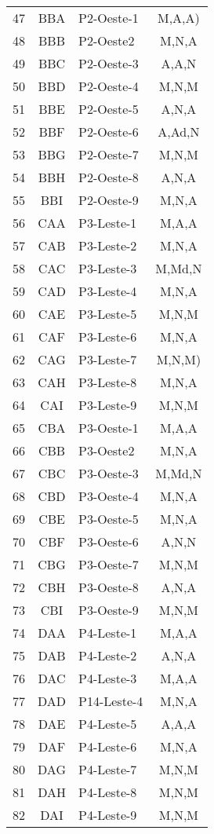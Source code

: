 \documentclass[
	12pt,				%
	openright,			%
	twoside,			%
	a4paper,			%
	english,			%
	french,				%
	spanish,			%
	brazil				%
	]{abntex2}
\begin{document}
\begin{apendicesenv}
\begin{longtable} {| c c l c |}
47 & BBA & P2-Oeste-1 & M,A,A)\\
48 & BBB & P2-Oeste2 & M,N,A\\
49 & BBC & P2-Oeste-3 & A,A,N\\
50 & BBD & P2-Oeste-4 & M,N,M\\
51 & BBE & P2-Oeste-5 & A,N,A\\
52 & BBF & P2-Oeste-6 & A,Ad,N\\
53 & BBG & P2-Oeste-7 & M,N,M\\
54 & BBH & P2-Oeste-8 & A,N,A\\
55 & BBI & P2-Oeste-9 & M,N,A\\


56 & CAA & P3-Leste-1 & M,A,A\\
57 & CAB & P3-Leste-2 & M,N,A\\
58 & CAC & P3-Leste-3 & M,Md,N\\
59 & CAD & P3-Leste-4 & M,N,A\\
60 & CAE & P3-Leste-5 & M,N,M\\
61 & CAF & P3-Leste-6 & M,N,A\\
62 & CAG & P3-Leste-7 & M,N,M)\\
63 & CAH & P3-Leste-8 & M,N,A\\
64 & CAI & P3-Leste-9 & M,N,M\\


65 & CBA & P3-Oeste-1 & M,A,A\\
66 & CBB & P3-Oeste2 & M,N,A\\
67 & CBC & P3-Oeste-3 & M,Md,N\\
68 & CBD & P3-Oeste-4 & M,N,A\\
69 & CBE & P3-Oeste-5 & M,N,A\\
70 & CBF & P3-Oeste-6 & A,N,N\\
71 & CBG & P3-Oeste-7 & M,N,M\\
72 & CBH & P3-Oeste-8 & A,N,A\\
73 & CBI & P3-Oeste-9 & M,N,M\\


74 & DAA & P4-Leste-1 & M,A,A\\
75 & DAB & P4-Leste-2 & A,N,A\\
76 & DAC & P4-Leste-3 & M,A,A\\
77 & DAD & P14-Leste-4 & M,N,A\\
78 & DAE & P4-Leste-5 & A,A,A\\
79 & DAF & P4-Leste-6 & M,N,A\\
80 & DAG & P4-Leste-7 & M,N,M\\
81 & DAH & P4-Leste-8 & M,N,M\\
82 & DAI & P4-Leste-9 & M,N,M\\



\end{longtable}
\end{apendicesenv}
\end{document}
